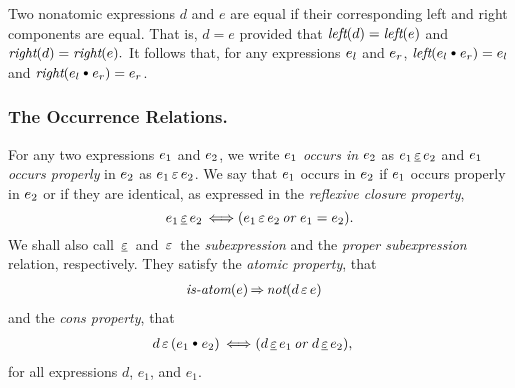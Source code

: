 \documentclass[runningheads]{llncs}
\DeclareMathOperator{\uor}{\emph{or}\,}
\DeclareMathOperator{\unot}{\emph{not}\kern-.0pt}
\DeclareMathOperator{\uimplies}{\Rightarrow}
\DeclareMathOperator{\uiff}{\iff}
\DeclareMathOperator{\isatm}{\emph{is-atom}}
\DeclareMathOperator{\lef}{\emph{left}}
\DeclareMathOperator{\rig}{\emph{right}}
\begin{document}
 Two nonatomic expressions $d$ and $e$ are equal 
if their corresponding left and right components are equal.  That is, $d = e$ provided that $\lef(d) = \lef(e)$ and $\rig(d) = \rig(e).$ It follows that, for any expressions $e_{l}$ and $e_{r}$, 
     $\lef(\e{l} \cons \e{r}) = \e{l}$ and $\rig(\e{l} \cons \e{r}) = \e{r}$. 

\subsubsection{The Occurrence Relations.} For any two expressions $e_{1}$ and $e_{2}$, we write $e_{1}$ \emph{occurs in} $e_{2}$ as  $e_{1} \, \underline{\varepsilon} \, e_{2}$ and  $e_{1}$ \emph{occurs properly} in $e_{2}$ as  $e_{1} \, \varepsilon \, e_{2}$. We say that 
$e_{1}$ occurs in $e_{2}$ if $e_{1}$ occurs properly in $e_{2}$ or if they are identical, as expressed in  the \emph{reflexive closure property},
\[ \e{1} \occurseq \e{2} \uiff (\e{1} \occursin \e{2} \uor \e{1} = \e{2}).\]
We shall also call $\, \underline{\varepsilon} \,$ and $\, \varepsilon \,$ the \emph{subexpression} and the \emph{proper subexpression} relation, respectively. They satisfy the \emph {atomic property},  that
\begin{align*}
&\isatm(e) \uimplies 
\unot(d \occursin e) 
\end{align*} 
and the \emph{cons property}, that
\begin{align*}
&d  \occursin  (\e{1} \cons \e{2}) \uiff 
(d   \occurseq  \e{1} \uor d  \occurseq  \e{2}),
\end{align*}
for all expressions $d$,  $e_1$, and $e_1$.
\end{document}
